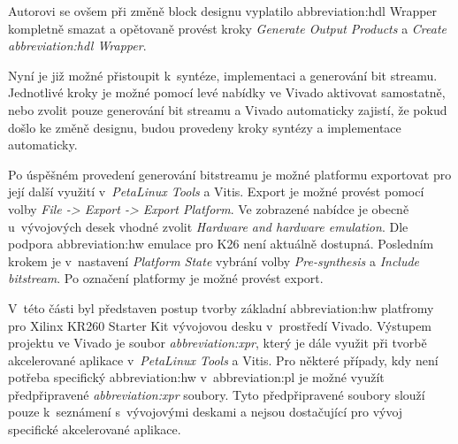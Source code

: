 \documentclass[a4paper, twoside, 11pt]{article}
\newcommand{\fbar}{\FloatBarrier}
\begin{document}
				Autorovi se ovšem při změně block designu vyplatilo \gls{abbreviation:hdl} Wrapper kompletně smazat a opětovaně provést kroky \textit{Generate Output Products} a \textit{Create \gls{abbreviation:hdl} Wrapper}.\par
				Nyní je již možné přistoupit k~syntéze, implementaci a generování bit streamu. Jednotlivé kroky je možné pomocí levé nabídky ve Vivado aktivovat samostatně, nebo zvolit pouze generování bit streamu a Vivado automaticky zajistí, že pokud došlo ke změně designu, budou provedeny kroky syntézy a implementace automaticky.\par
				Po úspěšném provedení generování bitstreamu je možné platformu exportovat pro její další využití v~\textit{PetaLinux Tools} a Vitis. Export je možné provést pomocí volby \textit{File -> Export -> Export Platform}. Ve zobrazené nabídce je obecně u~vývojových desek vhodné zvolit \textit{Hardware and hardware emulation}. Dle~\cite{hackster-add-peripherial-support-to-kria-kr260-vivado} podpora \gls{abbreviation:hw} emulace pro K26 není aktuálně dostupná. Posledním krokem je v~nastavení \textit{Platform State} vybrání volby \textit{Pre-synthesis} a \textit{Include bitstream}. Po označení platformy je možné provést export.\par
				V~této části byl představen postup tvorby základní \gls{abbreviation:hw} platfromy pro Xilinx KR260 Starter Kit vývojovou desku v~prostředí Vivado. Výstupem projektu ve Vivado je soubor \textit{\gls{abbreviation:xpr}}, který je dále využit při tvorbě akcelerované aplikace v~\textit{PetaLinux Tools} a Vitis. Pro některé případy, kdy není potřeba specifický \gls{abbreviation:hw} v~\gls{abbreviation:pl} je možné využít předpřipravené \textit{\gls{abbreviation:xpr}} soubory. Tyto předpřipravené soubory slouží pouze k~seznámení s~vývojovými deskami a nejsou dostačující pro vývoj specifické akcelerované aplikace.
				
			\fbar
\end{document}

